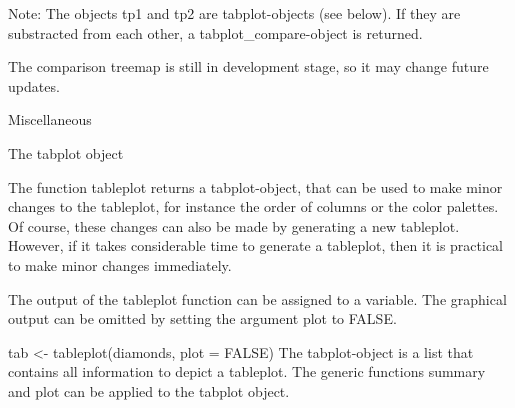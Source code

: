 {Note: The objects tp1 and tp2 are tabplot-objects (see below). If they are substracted from each other, a tabplot_compare-object is returned.

The comparison treemap is still in development stage, so it may change future updates.

Miscellaneous

The tabplot object

The function tableplot returns a tabplot-object, that can be used to make minor changes to the tableplot, for instance the order of columns or the color palettes. Of course, these changes can also be made by generating a new tableplot. However, if it takes considerable time to generate a tableplot, then it is practical to make minor changes immediately.

The output of the tableplot function can be assigned to a variable. The graphical output can be omitted by setting the argument plot to FALSE.

tab <- tableplot(diamonds, plot = FALSE)
The tabplot-object is a list that contains all information to depict a tableplot. The generic functions summary and plot can be applied to the tabplot object.

}
